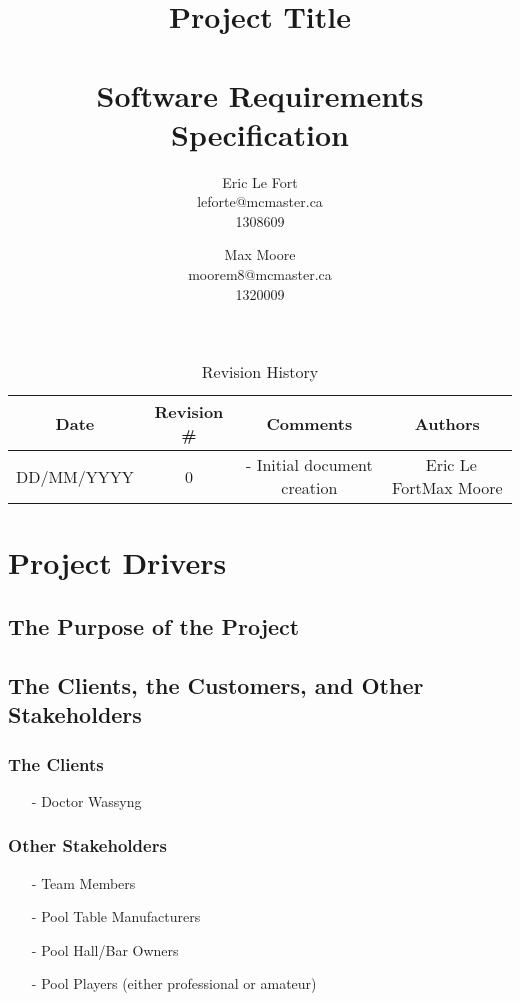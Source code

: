 \documentclass[titlepage]{article}
\title{Project Title\\~\\Software Requirements Specification}
\author{
Eric Le Fort\\leforte@mcmaster.ca\\1308609\and
Max Moore\\moorem8@mcmaster.ca\\1320009
}
\begin{document}
\maketitle


\tableofcontents
\listoffigures
\listoftables


\vfill
\begin{table}[!htbp]
\centering
\begin{tabular}{| C{3} | C{2} | C{5} | C{2.5} |}\hline
	Date			&Revision \#	&Comments						&Authors\\\hline
	DD/MM/YYYY		&0				&- Initial document creation	&~Eric Le Fort\newline Max Moore\\\hline
\end{tabular}
\caption{Revision History}
\end{table}
\newpage


\section{Project Drivers}
\subsection{The Purpose of the Project}

\subsection{The Clients, the Customers, and Other Stakeholders}
\subsubsection{The Clients}
\begin{itemize}
 \item[-]  Doctor Wassyng
\end{itemize}



\subsubsection{Other Stakeholders}
\begin{itemize}
\item[-] Team Members
\item[-]  Pool Table Manufacturers 
\item[-]  Pool Hall/Bar Owners
\item[-]  Pool Players (either professional or amateur)
\end{itemize}
\end{document}
